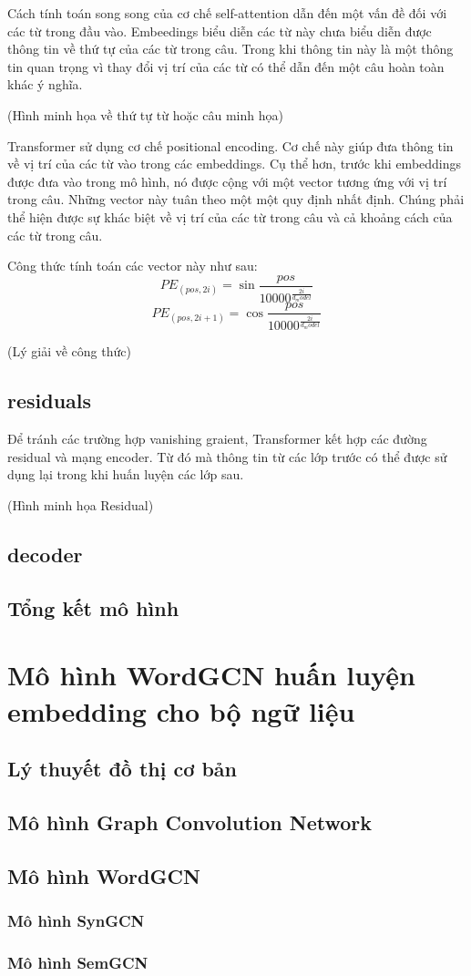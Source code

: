 Cách tính toán song song của cơ chế self-attention dẫn đến một vấn đề đối với các từ trong đầu vào. Embeedings biểu diễn các từ này chưa biểu diễn được thông tin về thứ tự của các từ trong câu. Trong khi thông tin này là một thông tin quan trọng vì thay đổi vị trí của các từ có thể dẫn đến một câu hoàn toàn khác ý nghĩa.

(Hình minh họa về thứ tự từ hoặc câu minh họa)

Transformer sử dụng cơ chế positional encoding. Cơ chế này giúp đưa thông tin về vị trí của các từ vào trong các embeddings. Cụ thể hơn, trước khi embeddings được đưa vào trong mô hình, nó được cộng với một vector tương ứng với vị trí trong câu. Những vector này tuân theo một một quy định nhất định. Chúng phải thể hiện được sự khác biệt về vị trí của các từ trong câu và cả khoảng cách của các từ trong câu. 

Công thức tính toán các vector này như sau: 
\begin{equation*}
	PE_{(pos, 2i)} = \sin{\frac{pos}{10000^{\frac{2i}{d_model}}}}
\end{equation*}
\begin{equation*}
	PE_{(pos, 2i+1)} = \cos{\frac{pos}{10000^{\frac{2i}{d_model}}}}
\end{equation*}

(Lý giải về công thức)

\subsection{residuals}
Để tránh các trường hợp vanishing graient, Transformer kết hợp các đường residual và mạng encoder. Từ đó mà thông tin từ các lớp trước có thể được sử dụng lại trong khi huấn luyện các lớp sau.

(Hình minh họa Residual)

\subsection{decoder}

\subsection{Tổng kết mô hình}

\section{Mô hình WordGCN huấn luyện embedding cho bộ ngữ liệu}
\subsection{Lý thuyết đồ thị cơ bản}

\subsection{Mô hình Graph Convolution Network}

\subsection{Mô hình WordGCN}
\subsubsection{Mô hình SynGCN}
\subsubsection{Mô hình SemGCN}